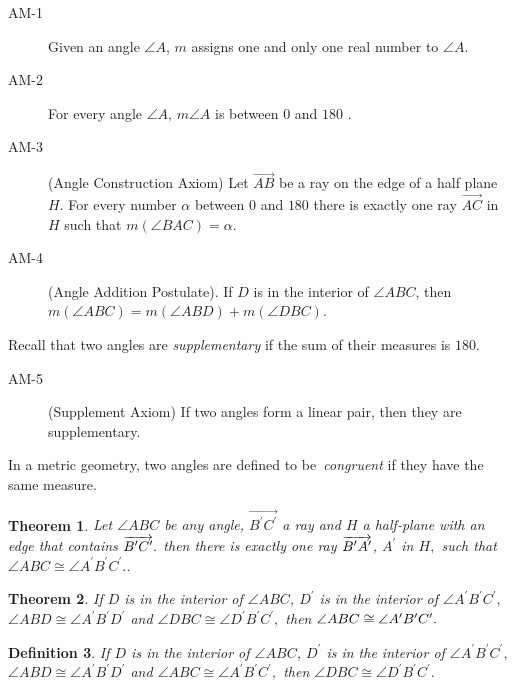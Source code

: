 \documentclass[12pt]{article}
\newtheorem{theorem}{Theorem}
\newtheorem{definition}[theorem]{Definition}
\begin{document}
\begin{description}
\item[AM-1]  Given an angle $\angle A$, $m$ assigns one and only one real
number to $\angle A$.

\item[AM-2]  For every angle $\angle A$, $m\angle A$ is between $0$ and $180$%
.

\item[AM-3]  (Angle Construction Axiom) Let $\overrightarrow{AB}$ be a ray
on the edge of a half plane $H$. For every number $\alpha $ between $0$ and $%
180$ there is exactly one ray $\overrightarrow{AC}$ in $H$ such that $%
m\left( \angle BAC\right) =\alpha $.

\item[AM-4]  (Angle Addition Postulate). If $D$ is in the interior of $%
\angle ABC$, then $m\left( \angle ABC\right) =m\left( \angle ABD\right)
+m\left( \angle DBC\right) $.
\end{description}

Recall that two angles are \emph{supplementary} if the sum of their measures
is $180$.

\begin{description}
\item[AM-5]  (Supplement Axiom) If two angles form a linear pair, then they
are supplementary.
\end{description}

In a metric geometry, two angles are defined to be\emph{\ congruent} if they
have the same measure.

\begin{theorem}
Let $\angle ABC$ be any angle, $\overrightarrow{B^{\prime }C^{\prime }}$ a
ray and $H$ a half-plane with an edge that contains $\overrightarrow{%
B^{\prime }C^{\prime }}.$ then there is exactly one ray $\overrightarrow{%
B^{\prime }A^{\prime }}$, $A^{\prime }$ in $H,$ such that $\angle ABC\cong
\angle A^{\prime }B^{\prime }C^{\prime }.$.\medskip 
\end{theorem}

\begin{theorem}
If $D$ is in the interior of $\angle ABC$, $D^{\prime }$ is in the interior
of $\angle A^{\prime }B^{\prime }C^{\prime },$ $\angle ABD\cong \angle
A^{\prime }B^{\prime }D^{\prime }$ and $\angle DBC\cong \angle D^{\prime
}B^{\prime }C^{\prime },$ then $\angle ABC\cong \angle A^{\prime }B^{\prime
}C^{\prime }.\medskip $
\end{theorem}

\begin{definition}
If $D$ is in the interior of $\angle ABC$, $D^{\prime }$ is in the interior
of $\angle A^{\prime }B^{\prime }C^{\prime },$ $\angle ABD\cong \angle
A^{\prime }B^{\prime }D^{\prime }$ and $\angle ABC\cong \angle A^{\prime
}B^{\prime }C^{\prime },$ then $\angle DBC\cong \angle D^{\prime }B^{\prime
}C^{\prime }.$\smallskip 
\end{definition}
\end{document}
